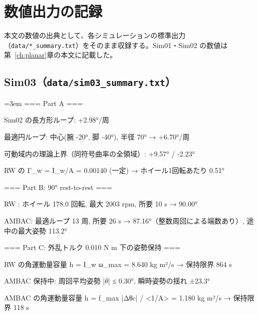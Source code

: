 \chapter{数値出力の記録}\label{app:outputs}
本文の数値の出典として、各シミュレーションの標準出力（\texttt{data/*\_summary.txt}）をそのまま収録する。Sim01・Sim02 の数値は第~\ref{ch:planar}章の本文に記載した。

\section{Sim03（\texttt{data/sim03\_summary.txt}）}
{\footnotesize\raggedright\sloppy\setlength{\parindent}{0pt}\setlength{\parskip}{0pt}\emergencystretch=3em
=== Part A ===\par
Sim02 の長方形ループ: +2.98°/周\par
最適円ループ: 中心(腕 -20°, 脚 -40°), 半径 70° → +6.70°/周\par
可動域内の理論上界（同符号曲率の全領域）: +9.57° / -2.23°\par
RW の Γ\_w = I\_w/A = 0.00140 (一定) → ホイール1回転あたり 0.51°\par
\mbox{}\par
=== Part B: 90° rest-to-rest ===\par
RW   : ホイール 178.0 回転, 最大 2003 rpm, 所要 10 s → 90.00°\par
AMBAC: 最適ループ 13 周, 所要 26 s → 87.16°（整数周回による端数あり）, 途中の最大姿勢 113.2°\par
\mbox{}\par
=== Part C: 外乱トルク 0.010 N m 下の姿勢保持 ===\par
RW    の角運動量容量 h = I\_w ω\_max          = 8.640 kg m²/s → 保持限界 864 s\par
AMBAC 保持中: 周回平均姿勢 |$\bar\theta$| ≤ 0.30°, 瞬時姿勢の揺れ ±23.3°\par
AMBAC の角運動量容量 h = f\_max |Δθc| / <1/A> = 1.180 kg m²/s → 保持限界 118 s\par
}

